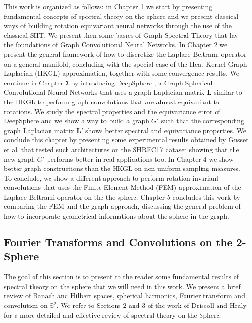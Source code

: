 This work is organized as follows: in Chapter 1 we start by presenting fundamental concepts of spectral theory on the sphere and we present classical ways of building rotation equivariant neural networks through the use of the classical SHT.  We present then some basics of Graph Spectral Theory that lay the foundations of Graph Convolutional Neural Networks.  In Chapter 2 we present the general framework of how to discretize the Laplace-Beltrami operator on a general manifold, concluding with the special case of the Heat Kernel Graph Laplacian (HKGL) approximation, together with some convergence results. We continue in Chapter 3 by introducing DeepSphere \cite{DeepSphere}, a Graph Spherical Convolutional Neural Networks that uses a graph Laplacian matrix $\mathbf L$ similar to the HKGL to perform graph convolutions that are almost equivariant to rotations. We study the spectral properties and the equivariance error of DeepSphere and we show a way to build a graph $G'$ such that the corresponding graph Laplacian matrix $\mathbf L'$ shows better spectral and equivariance properties. We conclude this chapter by presenting some experimental results obtained by Gusset et al. \cite{Gusset} that tested such architectures on the SHREC17 dataset \cite{SHREC17} showing that the new graph $G'$ performs better in real applications too. In Chapter 4 we show better graph constructions than the HKGL on non uniform sampling measures. To conclude, we show a different approach to perform rotation invariant convolutions that uses the Finite Element Method (FEM) approximation of the Laplace-Beltrami operator on the the sphere. Chapter 5 concludes this work by comparing the FEM and the graph approach, discussing the general problem of how to incorporate geometrical informations about the sphere in the graph.

\subsection{Fourier Transforms and Convolutions on the 2-Sphere}\label{sec:Fourier on the Sphere}
The goal of this section is to present to the reader some fundamental results of spectral theory on the sphere that we will need in this work. We present a brief review of Banach and Hilbert spaces, spherical harmonics, Fourier transform and convolution on $\mathbb S^2$. We refer to Sections 2 and 3 of the work of Driscoll and Healy \cite{Driscoll:1994:CFT:184069.184073} for a more detailed and effective review of spectral theory on the Sphere.

